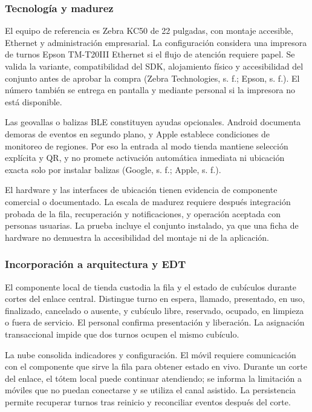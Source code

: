\documentclass[11pt]{article}
\begin{document}
\subsubsection{Tecnología y madurez}\label{tecnologuxeda-y-madurez-4}

El equipo de referencia es Zebra KC50 de 22 pulgadas, con montaje accesible, Ethernet y administración empresarial. La configuración considera una impresora de turnos Epson TM-T20III Ethernet si el flujo de atención requiere papel. Se valida la variante, compatibilidad del SDK, alojamiento físico y accesibilidad del conjunto antes de aprobar la compra (Zebra Technologies, s. f.; Epson, s. f.). El número también se entrega en pantalla y mediante personal si la impresora no está disponible.

Las geovallas o balizas BLE constituyen ayudas opcionales. Android documenta demoras de eventos en segundo plano, y Apple establece condiciones de monitoreo de regiones. Por eso la entrada al modo tienda mantiene selección explícita y QR, y no promete activación automática inmediata ni ubicación exacta solo por instalar balizas (Google, s. f.; Apple, s. f.).

El hardware y las interfaces de ubicación tienen evidencia de componente comercial o documentado. La escala de madurez requiere después integración probada de la fila, recuperación y notificaciones, y operación aceptada con personas usuarias. La prueba incluye el conjunto instalado, ya que una ficha de hardware no demuestra la accesibilidad del montaje ni de la aplicación.

\subsubsection{Incorporación a arquitectura y EDT}\label{incorporaciuxf3n-a-arquitectura-y-edt-4}

El componente local de tienda custodia la fila y el estado de cubículos durante cortes del enlace central. Distingue turno en espera, llamado, presentado, en uso, finalizado, cancelado o ausente, y cubículo libre, reservado, ocupado, en limpieza o fuera de servicio. El personal confirma presentación y liberación. La asignación transaccional impide que dos turnos ocupen el mismo cubículo.

La nube consolida indicadores y configuración. El móvil requiere comunicación con el componente que sirve la fila para obtener estado en vivo. Durante un corte del enlace, el tótem local puede continuar atendiendo; se informa la limitación a móviles que no puedan conectarse y se utiliza el canal asistido. La persistencia permite recuperar turnos tras reinicio y reconciliar eventos después del corte.
\end{document}
